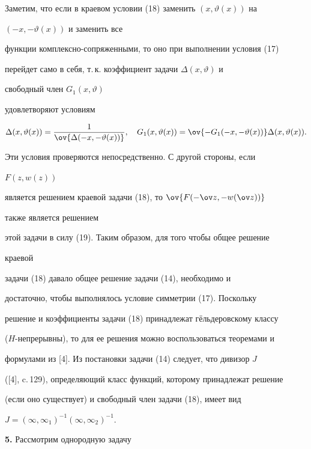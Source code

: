  


Заметим, что если в краевом условии (18) заменить $(x,\vartheta(x))$ на 


$(-x,-\vartheta(x))$ и заменить все 


функции комплексно-сопряженными, то оно при выполнении условия (17)


перейдет само в себя, т.\,к. коэффициент задачи $\Delta(x,\vartheta)$ и 


свободный член $G_1(x,\vartheta)$ 


удовлетворяют условиям 


\begin{equation} 


\Delta(x,\vartheta(x))=\frac{1}{\ov{\Delta(-x,-\vartheta(x))}},\quad 


G_1(x,\vartheta(x))=\ov{-G_1(-x,-\vartheta(x))} 


\Delta(x,\vartheta(x)). 


\end{equation} 


Эти условия проверяются непосредственно. С другой стороны, если 


$F(z,w(z))$ 


является решением краевой задачи (18), то $\ov{F(-\ov z,-w(\ov z))}$ 


также является решением 


этой задачи в силу (19). Таким образом, для того чтобы общее решение 


краевой 


задачи (18) давало общее решение задачи (14), необходимо и 


достаточно, чтобы выполнялось условие симметрии (17). Поскольку 


решение и коэффициенты задачи (18) принадлежат г\"ельдеровскому классу 


($H$-непрерывны), то для ее решения можно воспользоваться теоремами и 


формулами из [4]. Из постановки задачи (14) следует, что дивизор $J$ 


([4], c.\,129), определяющий класс функций, которому принадлежат решение 


(если оно существует) и свободный член задачи (18), имеет вид 


$J=(\infty,\infty_1)^{-1}(\infty,\infty_2)^{-1}$. 


\medskip 


 


{\bf 5.} Рассмотрим однородную задачу 


